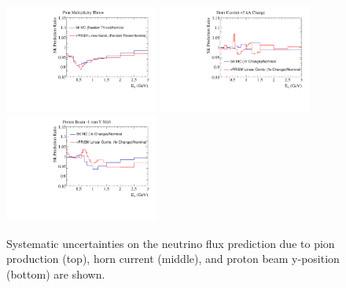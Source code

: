 \begin{figure}[htpb]
\begin{center}
  \includegraphics[width=0.45\textwidth] {figures/nuprism_pred_ratio_pion_mult_15.pdf}
  \includegraphics[width=0.45\textwidth] {figures/nuprism_pred_ratio_hcurr_5kA.pdf}
  \includegraphics[width=0.45\textwidth] {figures/nuprism_pred_ratio_pbeam_minusy.pdf}
\end{center}
\caption{Systematic uncertainties on the neutrino flux prediction due to pion production (top), horn current (middle), and proton beam y-position (bottom) are shown.}
\label{fig:fluxerrors}
\end{figure}

